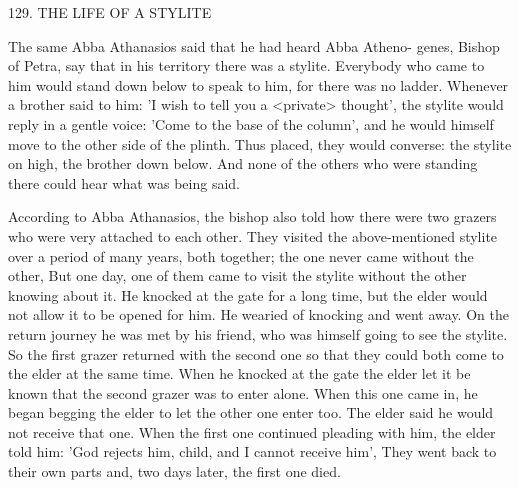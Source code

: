 129.
THE LIFE OF A STYLITE

The same Abba Athanasios said that he had heard Abba Atheno-
genes, Bishop of Petra, say that in his territory there was a stylite.
Everybody who came to him would stand down below to speak to
him, for there was no ladder.
Whenever a brother said to him: 'I
wish to tell you a <private> thought', the stylite would reply in a
gentle voice: 'Come to the base of the column', and he would
himself move to the other side of the plinth.
Thus placed, they
would converse: the stylite on high, the brother down below.
And
none of the others who were standing there could hear what was
being said.

According to Abba Athanasios, the bishop also told how there
were two grazers who were very attached to each other.
They visited
the above-mentioned stylite over a period of many years, both
together; the one never came without the other, But one day, one of
them came to visit the stylite without the other knowing about it.
He knocked at the gate for a long time, but the elder would not
allow it to be opened for him.
He wearied of knocking and went
away.
On the return journey he was met by his friend, who was
himself going to see the stylite.
So the first grazer returned with the
second one so that they could both come to the elder at the same
time.
When he knocked at the gate the elder let it be known that the
second grazer was to enter alone.
When this one came in, he began
begging the elder to let the other one enter too.
The elder said he
would not receive that one.
When the first one continued pleading
with him, the elder told him: 'God rejects him, child, and I cannot
receive him', They went back to their own parts and, two days later,
the first one died.

